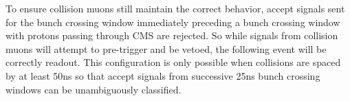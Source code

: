 To ensure collision muons still maintain the correct behavior, accept signals sent for the bunch crossing window immediately
preceding a bunch crossing window with protons passing through CMS are rejected. 
So while signals from collision muons will attempt to pre-trigger and be vetoed, the following event will be correctly readout.
This configuration is only possible  when collisions are spaced by at least 50ns so that accept signals from successive 25ns
bunch crossing windows can be unambiguously classified.


